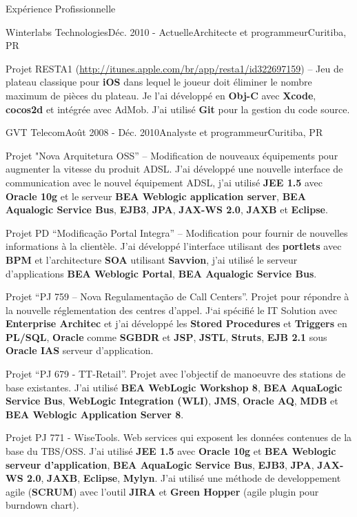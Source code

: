 \documentclass{resume}
\begin{document}
\begin{rSection}{Expérience Profissionnelle}
\begin{rSubsection}{Winterlabs Technologies}{Déc. 2010 - 
Actuelle}{Architecte et programmeur}{Curitiba, PR}
    \item Projet RESTA1 (\url{http://itunes.apple.com/br/app/resta1/id322697159}) – Jeu de plateau classique pour \textbf{iOS} dans lequel le joueur doit éliminer le nombre maximum de pièces du plateau. Je l’ai développé en \textbf{Obj-C} avec \textbf{Xcode}, \textbf{cocos2d} et intégrée avec AdMob. J’ai utilisé \textbf{Git} pour la gestion du code source.
    \end{rSubsection}
    \begin{rSubsection}{GVT Telecom}{Août 2008 - Déc. 2010}{Analyste et programmeur}{Curitiba, PR}
    \item Projet "Nova Arquitetura OSS” – Modification de nouveaux équipements pour augmenter la vitesse du produit ADSL. J'ai développé une nouvelle interface de communication avec le nouvel équipement ADSL, j'ai utilisé \textbf{JEE 1.5} avec \textbf{Oracle 10g} et le serveur \textbf{BEA Weblogic application server}, \textbf{BEA Aqualogic Service Bus}, \textbf{EJB3}, \textbf{JPA}, \textbf{JAX-WS 2.0}, \textbf{JAXB} et \textbf{Eclipse}.\\
    \item Projet PD “Modificação Portal Integra” – Modification pour fournir de nouvelles informations à la clientèle. J'ai développé l'interface  utilisant des \textbf{portlets} avec \textbf{BPM} et l'architecture \textbf{SOA} utilisant \textbf{Savvion}, j'ai utilisé le serveur d'applications \textbf{BEA Weblogic Portal}, \textbf{BEA Aqualogic Service Bus}.\\
    \item Projet “PJ 759 – Nova Regulamentação de Call Centers”. Projet pour répondre à la nouvelle réglementation des centres d'appel. J‘ai spécifié le IT Solution avec \textbf{Enterprise Architec} et j'ai développé les \textbf{Stored Procedures} et \textbf{Triggers} en \textbf{PL/SQL}, \textbf{Oracle} comme \textbf{SGBDR} et \textbf{JSP}, \textbf{JSTL}, \textbf{Struts}, \textbf{EJB 2.1} sous \textbf{Oracle IAS} serveur d'application.\\
    \item Projet “PJ 679 - TT-Retail”. Projet avec l’objectif de manoeuvre des stations de base existantes. J’ai utilisé \textbf{BEA WebLogic Workshop 8}, \textbf{BEA AquaLogic Service Bus}, \textbf{WebLogic Integration (WLI)}, \textbf{JMS}, \textbf{Oracle AQ}, \textbf{MDB} et \textbf{BEA Weblogic Application Server 8}.\\
    \item Projet PJ 771 - WiseTools. Web services qui exposent les données contenues de la base du TBS/OSS. J’ai utilisé \textbf{JEE 1.5} avec \textbf{Oracle 10g} et \textbf{BEA Weblogic serveur d'application}, \textbf{BEA AquaLogic Service Bus}, \textbf{EJB3}, \textbf{JPA}, \textbf{JAX-WS 2.0}, \textbf{JAXB}, \textbf{Eclipse}, \textbf{Mylyn}. J'ai utilisé une méthode de developpement agile (\textbf{SCRUM}) avec l'outil \textbf{JIRA} et \textbf{Green Hopper} (agile plugin pour burndown chart).\\

\end{rSubsection}
\end{rSection}
\end{document}
